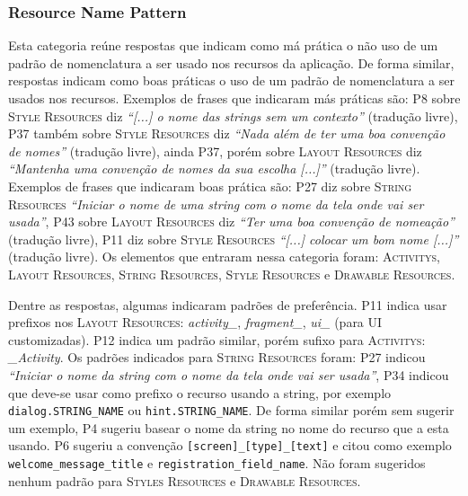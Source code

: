 \subsubsection{Resource Name Pattern}
Esta categoria re\'une respostas que indicam como m\'a pr\'atica o n\~ao uso de um padr\~ao de nomenclatura a ser usado nos recursos da aplica\c{c}\~ao. De forma similar, respostas indicam como boas pr\'aticas o uso de um padr\~ao de nomenclatura a ser usados nos recursos. Exemplos de frases que indicaram m\'as pr\'aticas s\~ao: P8 sobre \textsc{Style Resources} diz \textit{``[...] o nome das strings sem um contexto''} (tradu\c{c}\~ao livre), P37 tamb\'em sobre \textsc{Style Resources} diz \textit{``Nada al\'em de ter uma boa conven\c{c}\~ao de nomes''} (tradu\c{c}\~ao livre), ainda P37, por\'em sobre \textsc{Layout Resources} diz \textit{``Mantenha uma conven\c{c}\~ao de nomes da sua escolha [...]''} (tradu\c{c}\~ao livre). Exemplos de frases que indicaram boas pr\'atica s\~ao: P27 diz sobre \textsc{String Resources} \textit{``Iniciar o nome de uma string com o nome da tela onde vai ser usada''}, P43 sobre \textsc{Layout Resources} diz \textit{``Ter uma boa conven\c{c}\~ao de nomea\c{c}\~ao''} (tradu\c{c}\~ao livre), P11 diz sobre \textsc{Style Resources} \textit{``[...] colocar um bom nome [...]''} (tradu\c{c}\~ao livre). Os elementos que entraram nessa categoria foram: \textsc{Activitys}, \textsc{Layout Resources}, \textsc{String Resources}, \textsc{Style Resources} e \textsc{Drawable Resources}. 

Dentre as respostas, algumas indicaram padr\~oes de prefer\^encia. P11 indica usar prefixos nos \textsc{Layout Resources}: \textit{activity\_}, \textit{fragment\_}, \textit{ui\_} (para UI customizadas). P12 indica um padr\~ao similar, por\'em sufixo para \textsc{Activitys}: \textit{\_Activity}. Os padr\~oes indicados para \textsc{String Resources} foram: P27 indicou \textit{``Iniciar o nome da string com o nome da tela onde vai ser usada''}, P34 indicou que deve-se usar como prefixo o recurso usando a string, por exemplo \texttt{dialog.STRING\_NAME} ou \texttt{hint.STRING\_NAME}. De forma similar por\'em sem sugerir um exemplo, P4 sugeriu basear o nome da string no nome do recurso que a esta usando. P6 sugeriu a conven\c{c}\~ao \texttt{[screen]\_[type]\_[text]} e citou como exemplo \texttt{welcome\_message\_title} e \texttt{registration\_field\_name}. N\~ao foram sugeridos nenhum padr\~ao para \textsc{Styles Resources} e \textsc{Drawable Resources}.

